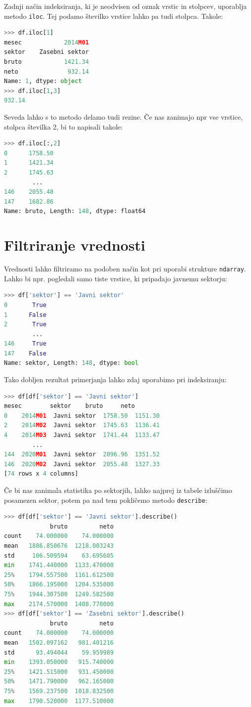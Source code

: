 Zadnji način indeksiranja, ki je neodvisen od oznak vrstic in stolpcev, uporablja metodo \texttt{iloc}. Tej podamo številko vrstice lahko pa tudi stolpca. Takole:
\begin{lstlisting}[language=python]
>>> df.iloc[1]
mesec            2014M01
sektor    Zasebni sektor
bruto            1421.34
neto              932.14
Name: 1, dtype: object
>>> df.iloc[1,3]
932.14
\end{lstlisting}
Seveda lahko s to metodo delamo tudi rezine. Če nas zanimajo npr vse vrstice, stolpca številka 2, bi to napisali takole:
\begin{lstlisting}[language=python]
>>> df.iloc[:,2]
0      1758.50
1      1421.34
2      1745.63
        ...
146    2055.48
147    1682.86
Name: bruto, Length: 148, dtype: float64
\end{lstlisting}

\section{Filtriranje vrednosti}
Vrednosti lahko filtriramo na podoben način kot pri uporabi strukture \texttt{ndarray}. Lahko bi npr. pogledali samo tiste vrstice, ki pripadajo javnemu sektorju:
\begin{lstlisting}[language=python]
>>> df['sektor'] == 'Javni sektor'
0       True
1      False
2       True
        ...
146     True
147    False
Name: sektor, Length: 148, dtype: bool
\end{lstlisting}
Tako dobljen rezultat primerjanja lahko zdaj uporabimo pri indeksiranju:
\begin{lstlisting}[language=python]
>>> df[df['sektor'] == 'Javni sektor']
mesec        sektor    bruto     neto
0    2014M01  Javni sektor  1758.50  1151.30
2    2014M02  Javni sektor  1745.63  1136.41
4    2014M03  Javni sektor  1741.44  1133.47
        ...
144  2020M01  Javni sektor  2096.96  1351.52
146  2020M02  Javni sektor  2055.48  1327.33
[74 rows x 4 columns]
\end{lstlisting}
Če bi nas zanimala statistika po sektorjih, lahko najprej iz tabele izluščimo posamezen sektor, potem pa nad tem pokličemo metodo \texttt{describe}:
\begin{lstlisting}[language=python]
>>> df[df['sektor'] == 'Javni sektor'].describe()
             bruto         neto
count    74.000000    74.000000
mean   1886.850676  1218.003243
std     106.509594    63.695605
min    1741.440000  1133.470000
25%    1794.557500  1161.612500
50%    1866.195000  1204.535000
75%    1944.307500  1249.582500
max    2174.570000  1408.770000
>>> df[df['sektor'] == 'Zasebni sektor'].describe()
             bruto         neto
count    74.000000    74.000000
mean   1502.097162   981.401216
std      93.494044    59.959989
min    1393.050000   915.740000
25%    1421.515000   931.450000
50%    1471.790000   962.165000
75%    1569.237500  1018.832500
max    1790.520000  1177.510000
\end{lstlisting}

